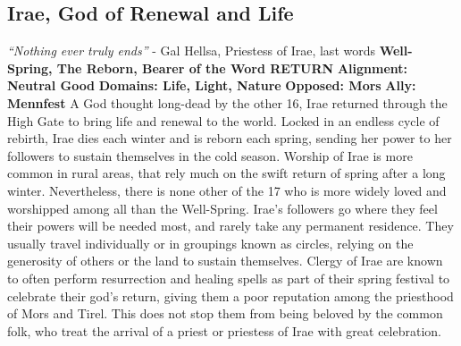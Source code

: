 \subsection{Irae, God of Renewal and Life}\label{god:irae}
\textit{“Nothing ever truly ends”}
\break
\hspace*{\fill} - Gal Hellsa, Priestess of Irae, last words
\break
\break
\textbf{Well-Spring, The Reborn, Bearer of the Word RETURN}\break
\hspace*{\fill}\break
\textbf{Alignment:\hspace*{\fill} Neutral Good} \break
\textbf{Domains:\hspace*{\fill} Life, Light, Nature} \break
\textbf{Opposed:\hspace*{\fill} Mors} \break
\textbf{Ally:\hspace*{\fill} Mennfest} \break
\hspace*{\fill}\break
A God thought long-dead by the other 16, Irae returned through the High Gate to bring life and renewal to the world. Locked in an endless cycle of  rebirth, Irae dies each winter and is reborn each spring, sending her power to her followers to sustain themselves in the cold season.\newline
Worship of Irae is more common in rural areas, that rely much on the swift return of spring after a long winter. Nevertheless, there is none other of the 17 who is more widely loved and worshipped among all than the Well-Spring. \newline
Irae’s followers go where they feel their powers will be needed most, and rarely take any permanent residence. They usually travel individually or in groupings known as circles, relying on the generosity of others or the land to sustain themselves.\newline
Clergy of Irae are known to often perform resurrection and healing spells as part of their spring festival to celebrate their god’s return, giving them a poor reputation among the priesthood of Mors and Tirel. This does not stop them from being beloved by the common folk, who treat the arrival of a priest or priestess of Irae with great celebration.


